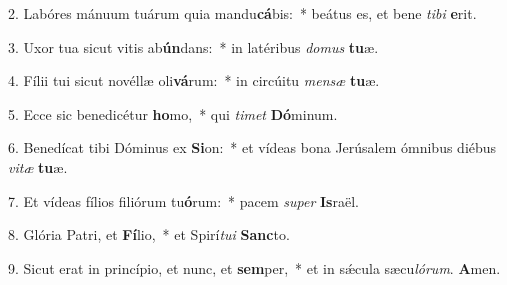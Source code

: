 2. Labóres mánuum tuárum quia mandu\textbf{cá}bis:~*  beátus es, et bene \textit{ti}\textit{bi} \textbf{e}rit.\

3. Uxor tua sicut vitis ab\textbf{ún}dans:~*  in latéribus \textit{do}\textit{mus} \textbf{tu}æ.\

4. Fílii tui sicut novéllæ oli\textbf{vá}rum:~*  in circúitu \textit{men}\textit{sæ} \textbf{tu}æ.\

5. Ecce sic benedicétur \textbf{ho}mo,~*  qui \textit{ti}\textit{met} \textbf{Dó}minum.\

6. Benedícat tibi Dóminus ex \textbf{Si}on:~*  et vídeas bona Jerúsalem ómnibus diébus \textit{vi}\textit{tæ} \textbf{tu}æ.\

7. Et vídeas fílios filiórum tu\textbf{ó}rum:~*  pacem \textit{su}\textit{per} \textbf{Is}raël.\

8. Glória Patri, et \textbf{Fí}lio,~*  et Spirí\textit{tu}\textit{i} \textbf{Sanc}to.\

9. Sicut erat in princípio, et nunc, et \textbf{sem}per,~*  et in sǽcula sæcu\textit{ló}\textit{rum}. \textbf{A}men.\

